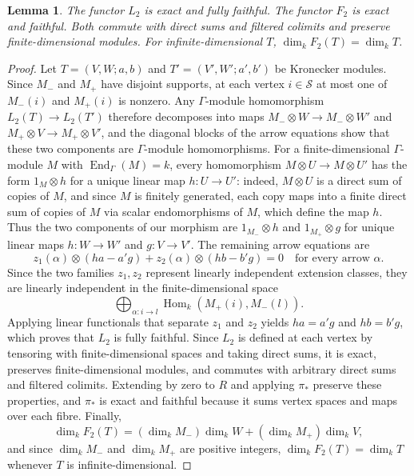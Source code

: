 \documentclass[a4paper,reqno,10pt]{amsart}
\newtheorem{lemma}[theorem]{Lemma}
\theoremstyle{definition}
\DeclareMathOperator{\Hom}{Hom}
\DeclareMathOperator{\End}{End}
\newcommand{\dm}{\dim_k}
\numberwithin{equation}{section}
\begin{document}
\begin{lemma}\label{lem:L2}
The functor $L_2$ is exact and fully faithful. The functor $F_2$ is
exact and faithful. Both commute with direct sums and filtered colimits
and preserve finite-dimensional modules. For infinite-dimensional $T$,
$\dm F_2(T)=\dm T$.
\end{lemma}
\begin{proof}
Let $T=(V,W;a,b)$ and $T'=(V',W';a',b')$ be Kronecker modules. Since $M_-$ and $M_+$ have disjoint supports, at each vertex $i\in\mathcal S$ at most one of $M_-(i)$ and $M_+(i)$ is nonzero. Any $\Gamma$-module homomorphism $L_2(T)\to L_2(T')$ therefore decomposes into maps $M_-\otimes W\to M_-\otimes W'$ and $M_+\otimes V\to M_+\otimes V'$, and the diagonal blocks of the arrow equations show that these two components are $\Gamma$-module homomorphisms.
For a finite-dimensional $\Gamma$-module $M$ with
$\End_\Gamma(M)=k$, every homomorphism $M\otimes U\to M\otimes U'$ has the form
$1_M\otimes h$ for a unique linear map $h:U\to U'$: indeed,
$M\otimes U$ is a direct sum of copies of $M$, and since $M$ is finitely generated, each copy maps into a finite direct sum of copies of $M$ via scalar endomorphisms of $M$, which define the map $h$. Thus the two components of our morphism are $1_{M_-}\otimes h$
and $1_{M_+}\otimes g$ for unique linear maps $h:W\to W'$ and $g:V\to V'$.
The remaining arrow equations are
\[
 z_1(\alpha)\otimes(ha-a'g)+
 z_2(\alpha)\otimes(hb-b'g)=0
 \quad\text{for every arrow }\alpha.
\]
Since the two families $z_1,z_2$ represent linearly independent extension classes, they are linearly independent in the
finite-dimensional space
\[
 \bigoplus_{\alpha:i\to l}\Hom_k(M_+(i),M_-(l)).
\]
Applying linear functionals that separate $z_1$ and $z_2$ yields
$ha=a'g$ and $hb=b'g$, which proves that $L_2$ is fully faithful.
Since $L_2$ is defined at each vertex by tensoring with finite-dimensional spaces and taking direct sums, it is exact, preserves finite-dimensional modules, and commutes with arbitrary direct sums and filtered colimits.
Extending by zero to $R$ and applying $\pi_*$ preserve these properties, and $\pi_*$ is exact and
faithful because it sums vertex spaces and maps over each fibre. Finally,
\[
 \dm F_2(T)=(\dm M_-)\dm W+(\dm M_+)\dm V,
\]
and since $\dm M_-$ and $\dm M_+$ are positive integers, $\dm F_2(T)=\dm T$ whenever $T$ is infinite-dimensional.
\end{proof}
\end{document}
